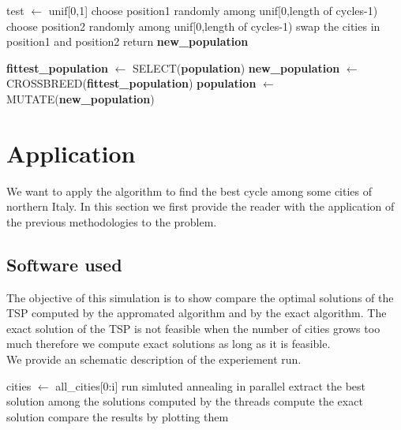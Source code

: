 \documentclass{article}
\begin{document}
\begin{algorithm}[H]
    \begin{algorithmic}[1]
        \State test $\leftarrow$ unif[0,1]
        	\State choose position1 randomly among unif[0,length of cycles-1)
  			\State choose position2 randomly among unif[0,length of cycles-1)
  			\State swap the cities in position1 and position2
        \EndIf
       \EndFor
        \State return \textbf{new\_population}
       \EndFunction
\end{algorithmic}
\end{algorithm}


\begin{algorithm}[H]
    \begin{algorithmic}[1]
        \State \textbf{fittest\_population} $\leftarrow$ SELECT(\textbf{population})
        \State \textbf{new\_population} $\leftarrow$ CROSSBREED(\textbf{fittest\_population})
       \State \textbf{population} $\leftarrow$ MUTATE(\textbf{new\_population})
       \EndFunction
\end{algorithmic}
\end{algorithm}

\section{Application} 
We want to apply the algorithm to find the best cycle among some cities of northern Italy.
In this section we first provide the reader with the application of the previous methodologies to the problem. 

\subsection{Software used}
The objective of this simulation is to show compare the optimal solutions of the TSP computed by the appromated algorithm and by the exact algorithm. The exact solution of the TSP is not feasible when the number of cities grows too much therefore we compute exact solutions as long as it is feasible. \\
We provide an schematic description of the experiement run. 
\begin{algorithm}[H]
    \begin{algorithmic}[1]
       	\State  cities $\leftarrow$ all\_cities[0:i]
       		\State run simluted annealing in parallel
       	\EndFor 
       	\State extract the best solution among the solutions computed by the threads
       		\State compute the exact solution
       	\EndIf
       	\State compare the results by plotting them
       \EndFor
       \EndFunction
\end{algorithmic}
\end{algorithm}
\end{document}
